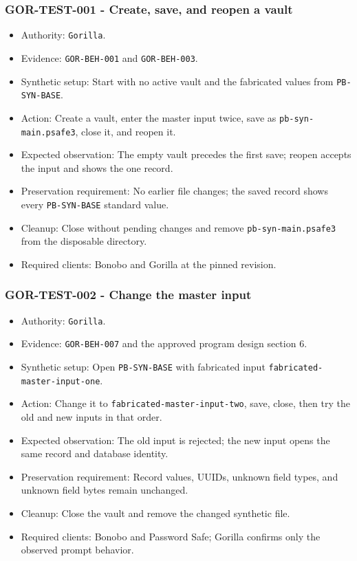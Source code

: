 \documentclass[
  letterpaper,
]{article}
\newcommand{\passthrough}[1]{#1}
\providecommand{\tightlist}{%
  \setlength{\itemsep}{0pt}\setlength{\parskip}{0pt}}
\begin{document}
\subsubsection{GOR-TEST-001 - Create, save, and reopen a vault}\label{gor-test-001---create-save-and-reopen-a-vault}

\begin{itemize}
\tightlist
\item
  Authority: \passthrough{\lstinline!Gorilla!}.
\item
  Evidence: \nolinkurl{GOR-BEH-001} and \nolinkurl{GOR-BEH-003}.
\item
  Synthetic setup: Start with no active vault and the fabricated values from \nolinkurl{PB-SYN-BASE}.
\item
  Action: Create a vault, enter the master input twice, save as \nolinkurl{pb-syn-main.psafe3}, close it, and reopen it.
\item
  Expected observation: The empty vault precedes the first save; reopen accepts the input and shows the one record.
\item
  Preservation requirement: No earlier file changes; the saved record shows every \nolinkurl{PB-SYN-BASE} standard
  value.
\item
  Cleanup: Close without pending changes and remove \nolinkurl{pb-syn-main.psafe3} from the disposable directory.
\item
  Required clients: Bonobo and Gorilla at the pinned revision.
\end{itemize}

\subsubsection{GOR-TEST-002 - Change the master input}\label{gor-test-002---change-the-master-input}

\begin{itemize}
\tightlist
\item
  Authority: \passthrough{\lstinline!Gorilla!}.
\item
  Evidence: \nolinkurl{GOR-BEH-007} and the approved program design section 6.
\item
  Synthetic setup: Open \nolinkurl{PB-SYN-BASE} with fabricated input \nolinkurl{fabricated-master-input-one}.
\item
  Action: Change it to \nolinkurl{fabricated-master-input-two}, save, close, then try the old and new inputs in that
  order.
\item
  Expected observation: The old input is rejected; the new input opens the same record and database identity.
\item
  Preservation requirement: Record values, UUIDs, unknown field types, and unknown field bytes remain unchanged.
\item
  Cleanup: Close the vault and remove the changed synthetic file.
\item
  Required clients: Bonobo and Password Safe; Gorilla confirms only the observed prompt behavior.
\end{itemize}
\end{document}
